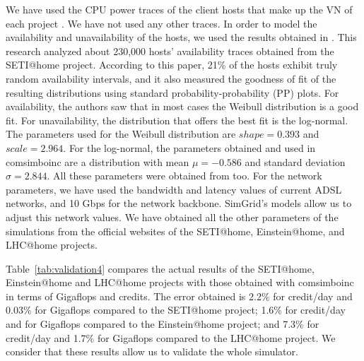 We have used the CPU power traces of the client hosts that make up the VN of each project \cite{SETIflops, EINSTEINflops, LHCflops}. We have not used any other traces. In order to model the availability and unavailability of the hosts, we used the results obtained in \cite{Javadi2011}. This research analyzed about 230,000 hosts' availability traces obtained from the SETI@home project. According to this paper, 21\% of the hosts exhibit truly random availability intervals, and it also measured the goodness of fit of the resulting distributions using standard probability-probability (PP) plots. For availability, the authors saw that in most cases the Weibull distribution is a good fit. For unavailability, the distribution that offers the best fit is the log-normal. The parameters used for the Weibull distribution are $shape=0.393$ and $scale=2.964$. For the log-normal, the parameters obtained and used in \gls{comsimboinc} are a distribution with mean $\mu = -0.586$ and standard deviation $\sigma=2.844$. All these parameters were obtained from \cite{Javadi2011} too. For the network parameters, we have used the bandwidth and latency values of current ADSL networks, and 10 Gbps for the network backbone. SimGrid's models allow us to adjust this network values. We have obtained all the other parameters of the simulations from the official websites of the SETI@home, Einstein@home, and LHC@home projects.

\begin{table}[htbp]
\centering
{}
\caption{Validation of the whole simulator.}
\label{tab:validation4}
\end{table}

Table~\ref{tab:validation4} compares the actual results of the SETI@home, Einstein@home and LHC@home projects with those obtained with \gls{comsimboinc} in terms of Giga\acrshort{flops} and credits. The error obtained is 2.2\% for credit/day and 0.03\% for Giga\acrshort{flops} compared to the SETI@home project; 1.6\% for credit/day and for Giga\acrshort{flops} compared to the Einstein@home project; and 7.3\% for credit/day and 1.7\% for Giga\acrshort{flops} compared to the LHC@home project. We consider that these results allow us to validate the whole simulator.

